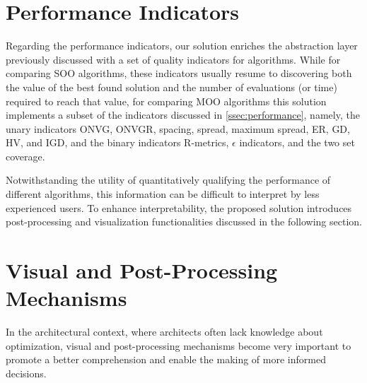 \section{Performance Indicators}
Regarding the performance indicators, our solution enriches the abstraction layer previously discussed with a set of quality indicators for algorithms. While for comparing \ac{SOO} algorithms, these indicators usually resume to discovering both the value of the best found solution and the number of evaluations (or time) required to reach that value, for comparing \ac{MOO} algorithms this solution implements a subset of the indicators discussed in \cref{ssec:performance}, namely, the unary indicators \ac{ONVG}, \ac{ONVGR}, spacing, spread, maximum spread, \ac{ER}, \ac{GD}, \ac{HV}, and \ac{IGD}, and the binary indicators R-metrics, $\epsilon$ indicators, and the two set coverage.

Notwithstanding the utility of quantitatively qualifying the performance of different algorithms, this information can be difficult to interpret by less experienced users. To enhance interpretability, the proposed solution introduces post-processing and visualization functionalities discussed in the following section.

\section{Visual and Post-Processing Mechanisms}
In the architectural context, where architects often lack knowledge about optimization, visual and post-processing mechanisms become very important to promote a better comprehension and enable the making of more informed decisions. 

